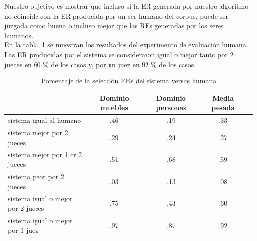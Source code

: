 Nuestro objetivo es mostrar que incluso si la ER generada por nuestro algoritmo no coincide con la ER producida por un ser humano del corpus, puede ser juzgada como buena o incluso mejor que las REs generadas por los seres humanos.\\

En la tabla~\ref{system-versus-human} se muestran los resultados del experimento de evaluaci\'on humana.
Las ER producidas por el sistema se consideraron igual o mejor tanto por 2
jueces en 60 \% de los casos y, por un juez en 92 \% de los casos.\\

\begin{table}[h!]
\begin{center}
\begin{tabular}{|l|c|c|c|c|}
\hline
 & Dominio muebles & Dominio personas & Media pesada \\
\hline
sistema igual al humano  	&	.46	&	.19	&	.33 \\
sistema mejor por 2 jueces &	.29 	& 	.24 	& 	.27 \\
sistema mejor por 1 or 2 jueces & .51	&	.68	&	.59 \\
sistema peor por 2 jueces &	.03	&	.13	&	.08 \\
sistema igual o mejor por 2 jueces  &.75  &       .43	&       .60 \\
sistema igual o mejor por 1 juez  &.97	&	.87	&	.92 \\
\hline
\end{tabular}
\caption{Porcentaje de la selecci\'on ERs del sistema versus humana} 
\label{system-versus-human}
\vspace*{-.5cm}
\end{center}
\end{table}



